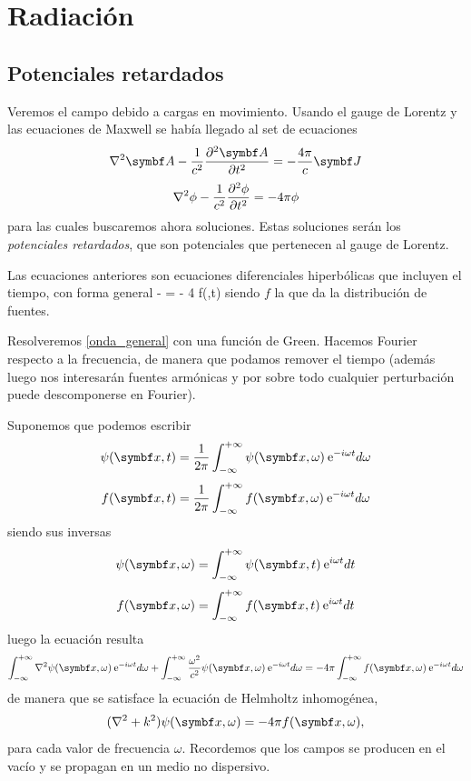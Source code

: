 \documentclass[10pt,oneside]{CBFT_book}
\begin{document}
\chapter{Radiación}


\section{Potenciales retardados}

Veremos el campo debido a cargas en movimiento.
Usando el gauge de Lorentz y las ecuaciones de Maxwell se había llegado al 
set de ecuaciones
\[
	\lapm{\vb{A}} - \frac{1}{c^2} \dpar[2]{\vb{A}}{t} = -\frac{4\pi}{c} \vb{J}
\]
\[
	\lapm{\phi} - \frac{1}{c^2} \dpar[2]{\phi}{t} = - 4 \pi \phi
\]
para las cuales buscaremos ahora soluciones.
Estas soluciones serán los {\it potenciales retardados}, que son potenciales que pertenecen al gauge
de Lorentz.

Las ecuaciones anteriores son ecuaciones diferenciales hiperbólicas que incluyen el tiempo, 
con forma general 
\be
	\lapm{\psi} -   = - 4 \pi f(,t)
	\label{onda_general}
\ee
siendo $f$ la que da la distribución de fuentes.

Resolveremos \eqref{onda_general} con una función de Green. Hacemos Fourier respecto a la frecuencia, de
manera que podamos remover el tiempo (además luego nos interesarán fuentes armónicas y por sobre todo
cualquier perturbación puede descomponerse en Fourier).

Suponemos que podemos escribir
\[
	\psi(\vb{x},t) = \frac{1}{2\pi}\int_{-\infty}^{+\infty} \psi(\vb{x},\omega) \euler^{-i\omega t} 
	d\omega
\]
\[
	f(\vb{x},t) = \frac{1}{2\pi}\int_{-\infty}^{+\infty} f(\vb{x},\omega) \euler^{-i\omega t} d\omega
\]
siendo sus inversas
\[
	\psi(\vb{x},\omega) = \int_{-\infty}^{+\infty} \psi(\vb{x}, t) \euler^{i\omega t} dt
\]
\[
	f(\vb{x},\omega) = \int_{-\infty}^{+\infty} f(\vb{x},t) \euler^{i\omega t} dt
\]
luego la ecuación resulta 
\[
	\int_{-\infty}^{+\infty} \lapm{\psi}(\vb{x},\omega) \euler^{ -i\omega t} d\omega +
	\int_{-\infty}^{+\infty} \frac{\omega^2}{c^2}\psi(\vb{x},\omega) \euler^{ -i\omega t} d\omega = 
		- 4 \pi \int_{-\infty}^{+\infty} f(\vb{x},\omega) \euler^{ -i\omega t} d\omega
\]
de manera que se satisface la ecuación de Helmholtz inhomogénea,
\[
	(\nabla^2 + k^2)\psi(\vb{x},\omega) = - 4\pi f(\vb{x},\omega),
\]
para cada valor de frecuencia $\omega$.
Recordemos que los campos se producen en el vacío y se propagan en un medio no dispersivo.
\end{document}
